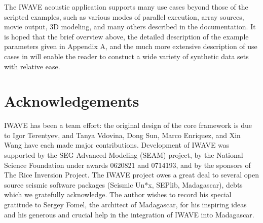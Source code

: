 The IWAVE acoustic application supports many use cases beyond those of
the scripted examples, such as various modes of parallel execution,
array sources, movie output, 3D modeling, and many others described in
the documentation.
It is hoped that the brief overview above, the detailed description of the example
parameters given in Appendix A, and the much more extensive
description of use cases in \cite[]{IWAVE} will enable the reader to
constuct a wide variety of synthetic data sets with relative ease.

\section{Acknowledgements}
IWAVE has been a team effort: the original design of the core
framework is due to Igor Terentyev, and Tanya Vdovina, Dong Sun, Marco
Enriquez, and Xin Wang have each made major contributions.
Development of IWAVE was supported by the SEG Advanced Modeling (SEAM)
project, by the National Science Foundation under awards 0620821 and
0714193, and by the sponsors of The Rice Inversion Project. The IWAVE
project owes a great deal to several open source seismic software
packages (Seismic Un*x, SEPlib, Madagascar), debts which we gratefully
acknowledge. The author wishes to record his special gratitude to
Sergey Fomel, the architect of Madagascar, for his inspiring ideas and
his generous and crucial help in the integration of IWAVE into Madagascar.





